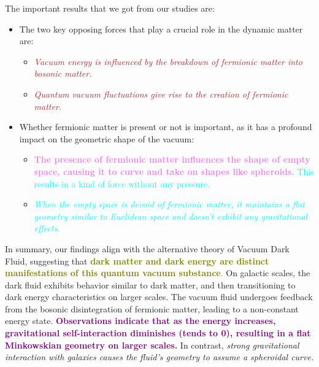 \documentclass[aspectratio=169,xcolor=dvipsnames, t]{beamer}
\begin{document}
\begin{frame}
\vspace{1cm}
The important results that we got from our studies are:
\begin{itemize}
    \item The two key opposing forces that play a crucial role in the dynamic matter are: 
\begin{itemize}
   \item  \textcolor{brown}{\textit{Vacuum energy is influenced by the breakdown of fermionic matter into bosonic matter.}}
   \item \textcolor{brown}{\textit{Quantum vacuum fluctuations give rise to the creation of fermionic matter.}}
\end{itemize}
\item Whether fermionic matter is present or not is important, as it has a profound impact on the geometric shape of the vacuum:
\begin{itemize}
\item \textcolor{cyan}{\textbf{\textcolor{violet}{The presence of fermionic matter influences the shape of empty space, causing it to curve and take on shapes like spheroids.}} This results in a kind of force without any pressure.}
\item \textcolor{cyan}{\textit{When the empty space is devoid of fermionic matter, it maintains a flat geometry similar to Euclidean space and doesn't exhibit any gravitational effects.}}
\end{itemize}
\end{itemize}
\end{frame}
\begin{frame}
\vspace{1cm}
In summary, our findings align with the alternative theory
of Vacuum Dark Fluid, suggesting that \textcolor{olive}{\textbf{dark matter and
dark energy are distinct manifestations of this quantum vacuum substance}.} On galactic scales, the dark fluid exhibits
behavior similar to dark matter, and then transitioning to
dark energy characteristics on larger scales. The vacuum
fluid undergoes feedback from the bosonic disintegration of
fermionic matter, leading to a non-constant energy state.
\textcolor{purple}{\textbf{Observations indicate that as the energy increases, gravitational self-interaction diminishes (tends to 0), resulting
in a flat Minkowskian geometry on larger scales.} }In contrast, \textit{strong gravitational interaction with galaxies causes
the fluid’s geometry to assume a spheroidal curve.}
\end{frame}
\end{document}
